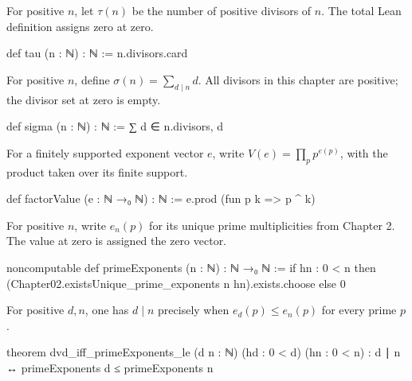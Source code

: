 \begin{definition}
  For positive $n$, let $\tau(n)$ be the number of positive divisors of $n$.
  The total Lean definition assigns zero at zero.

  \begin{lean}
    def tau (n : ℕ) : ℕ := n.divisors.card
  \end{lean}
\end{definition}

\begin{definition}
  For positive $n$, define $\sigma(n)=\sum_{d\mid n}d$.
  All divisors in this chapter are positive; the divisor set at zero is empty.

  \begin{lean}
    def sigma (n : ℕ) : ℕ := ∑ d ∈ n.divisors, d
  \end{lean}
\end{definition}

\begin{definition}
  For a finitely supported exponent vector $e$, write $V(e)=\prod_p p^{e(p)}$, with the product
  taken over its finite support.

  \begin{lean}
    def factorValue (e : ℕ →₀ ℕ) : ℕ := e.prod (fun p k => p ^ k)
  \end{lean}
\end{definition}

\begin{definition}
  For positive $n$, write $e_n(p)$ for its unique prime multiplicities from Chapter 2.
  The value at zero is assigned the zero vector.

  \begin{lean}
    noncomputable def primeExponents (n : ℕ) : ℕ →₀ ℕ :=
      if hn : 0 < n then (Chapter02.existsUnique_prime_exponents n hn).exists.choose else 0
  \end{lean}
\end{definition}

\begin{theorem}
  \label{ent:thm:dvd-iff-primeexponents-le}
  For positive $d,n$, one has $d\mid n$ precisely when $e_d(p)\le e_n(p)$ for every prime $p$.

  \begin{lean}
    theorem dvd_iff_primeExponents_le (d n : ℕ) (hd : 0 < d) (hn : 0 < n) :
        d ∣ n ↔ primeExponents d ≤ primeExponents n
  \end{lean}
\end{theorem}

